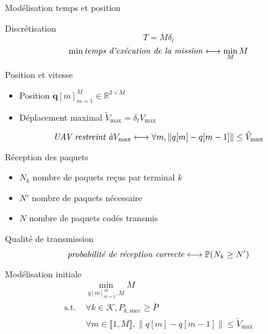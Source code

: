 \begin{frame}{Modélisation temps et position}
  \begin{block}{Discrétisation}
    \[ T = M \delta_t \]
    \begin{equation}
      \min \text{\textit{temps d'exécution de la mission}}
      \longleftrightarrow \min_M M
    \end{equation}
  \end{block}
  \begin{block}{Position et vitesse}
    \begin{itemize}
    \item Position \( \mathbf{q}[m]_{m = 1}^M \in \mathbb{R}^{2 \times
      M} \)
    \item Déplacement maximal \( \tilde{V}_{\text{max}} = \delta_t
      V_{\text{max}} \)
    \end{itemize}
    \begin{equation}
      \text{\textit{UAV restreint à}} V_{\text{max}} \longleftrightarrow
      \forall m, \| q[m] - q[m - 1] \| \leq \tilde{V}_{\text{max}}
    \end{equation}
  \end{block}
\end{frame}
\begin{frame}{Réception des paquets}
  \begin{itemize}
  \item \( N_k \) nombre de paquets reçus par terminal \( k \)
  \item \( N' \) nombre de paquets nécessaire
  \item \( N \) nombre de paquets codés transmis
  \end{itemize}
  \begin{block}{Qualité de transmission}
    \begin{equation}
      \text{\textit{probabilité de réception correcte}} \longleftrightarrow
      \mathbb{P}(N_k \geq N')
    \end{equation}
  \end{block}
\end{frame}
\begin{frame}{Modélisation initiale}
  \begin{equation}\tag{P1}
    \begin{aligned}
      & \min_{q[m]_{m=1}^M, M} M \\
      \text{s.t. } & \forall k \in \mathcal{K}, P_{k, \text{succ}}
      \geq \bar{P} \\
      & \forall m \in \llbracket 1, M \rrbracket, \| q[m] - q[m - 1]
      \| \leq \tilde{V}_{\text{max}}
    \end{aligned}
  \end{equation}
\end{frame}

